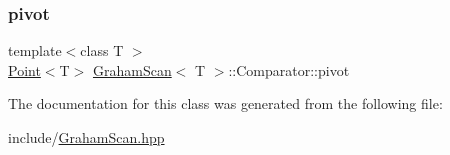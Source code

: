 \subsubsection{\texorpdfstring{pivot}{pivot}}
{\footnotesize\ttfamily template$<$class T $>$ \\
\mbox{\hyperlink{classPoint}{Point}}$<$T$>$ \mbox{\hyperlink{classGrahamScan}{Graham\+Scan}}$<$ T $>$\+::Comparator\+::pivot\hspace{0.3cm}{\ttfamily [private]}}



The documentation for this class was generated from the following file\+:\begin{DoxyCompactItemize}
\item 
include/\mbox{\hyperlink{GrahamScan_8hpp}{Graham\+Scan.\+hpp}}\end{DoxyCompactItemize}
